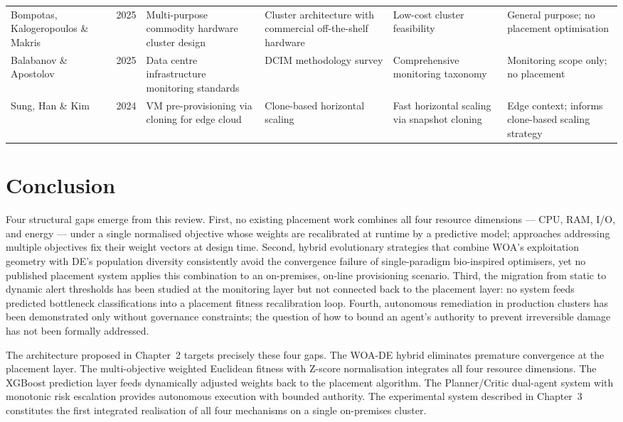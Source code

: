\documentclass[12pt,a4paper]{report}
\begin{document}
\begin{longtable}{L{2.2cm} C{1cm} L{3.2cm} L{2.8cm} L{2.5cm} L{2.8cm}}
Bompotas, Kalogeropoulos \& Makris \cite{bompotas2025commc}
  & 2025
  & Multi-purpose commodity hardware cluster design
  & Cluster architecture with commercial off-the-shelf hardware
  & Low-cost cluster feasibility
  & General purpose; no placement optimisation \\
\addlinespace

Balabanov \& Apostolov \cite{balabanov2025dcim}
  & 2025
  & Data centre infrastructure monitoring standards
  & DCIM methodology survey
  & Comprehensive monitoring taxonomy
  & Monitoring scope only; no placement \\
\addlinespace

Sung, Han \& Kim \cite{sung2024cloning}
  & 2024
  & VM pre-provisioning via cloning for edge cloud
  & Clone-based horizontal scaling
  & Fast horizontal scaling via snapshot cloning
  & Edge context; informs clone-based scaling strategy \\

\end{longtable}

\section{Conclusion}

Four structural gaps emerge from this review. First, no existing placement work
combines all four resource dimensions --- CPU, RAM, I/O, and energy --- under a
single normalised objective whose weights are recalibrated at runtime by a predictive
model; approaches addressing multiple objectives fix their weight vectors at design
time. Second, hybrid evolutionary strategies that combine WOA's exploitation
geometry with DE's population diversity consistently avoid the convergence failure
of single-paradigm bio-inspired optimisers, yet no published placement system applies
this combination to an on-premises, on-line provisioning scenario. Third, the
migration from static to dynamic alert thresholds has been studied at the
monitoring layer but not connected back to the placement layer: no system feeds
predicted bottleneck classifications into a placement fitness recalibration loop.
Fourth, autonomous remediation in production clusters has been demonstrated only
without governance constraints; the question of how to bound an agent's authority
to prevent irreversible damage has not been formally addressed.

The architecture proposed in Chapter~2 targets precisely these four gaps. The
WOA-DE hybrid eliminates premature convergence at the placement layer. The
multi-objective weighted Euclidean fitness with Z-score normalisation integrates all
four resource dimensions. The XGBoost prediction layer feeds dynamically adjusted
weights back to the placement algorithm. The Planner/Critic dual-agent system with
monotonic risk escalation provides autonomous execution with bounded authority. The
experimental system described in Chapter~3 constitutes the first integrated
realisation of all four mechanisms on a single on-premises cluster.
\end{document}
